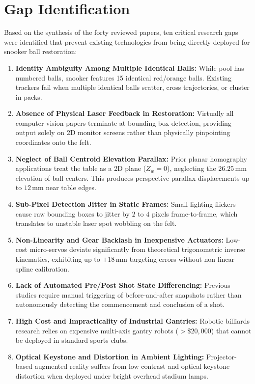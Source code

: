 \section{Gap Identification}
Based on the synthesis of the forty reviewed papers, ten critical research gaps were identified that prevent existing technologies from being directly deployed for snooker ball restoration:
\begin{enumerate}
    \item \textbf{Identity Ambiguity Among Multiple Identical Balls:} While pool has numbered balls, snooker features 15 identical red/orange balls. Existing trackers \cite{ref2, ref21} fail when multiple identical balls scatter, cross trajectories, or cluster in packs.
    \item \textbf{Absence of Physical Laser Feedback in Restoration:} Virtually all computer vision papers \cite{ref1, ref3, ref12} terminate at bounding-box detection, providing output solely on 2D monitor screens rather than physically pinpointing coordinates onto the felt.
    \item \textbf{Neglect of Ball Centroid Elevation Parallax:} Prior planar homography applications \cite{ref7, ref13} treat the table as a 2D plane ($Z_w = 0$), neglecting the $26.25\,\text{mm}$ elevation of ball centers. This produces perspective parallax displacements up to $12\,\text{mm}$ near table edges.
    \item \textbf{Sub-Pixel Detection Jitter in Static Frames:} Small lighting flickers cause raw bounding boxes to jitter by $2$ to $4$ pixels frame-to-frame, which translates to unstable laser spot wobbling on the felt.
    \item \textbf{Non-Linearity and Gear Backlash in Inexpensive Actuators:} Low-cost micro-servos deviate significantly from theoretical trigonometric inverse kinematics, exhibiting up to $\pm 18\,\text{mm}$ targeting errors without non-linear spline calibration.
    \item \textbf{Lack of Automated Pre/Post Shot State Differencing:} Previous studies require manual triggering of before-and-after snapshots rather than autonomously detecting the commencement and conclusion of a shot.
    \item \textbf{High Cost and Impracticality of Industrial Gantries:} Robotic billiards research \cite{ref15, ref16} relies on expensive multi-axis gantry robots ($>\$20{,}000$) that cannot be deployed in standard sports clubs.
    \item \textbf{Optical Keystone and Distortion in Ambient Lighting:} Projector-based augmented reality \cite{ref8, ref25} suffers from low contrast and optical keystone distortion when deployed under bright overhead stadium lamps.

\end{enumerate}
